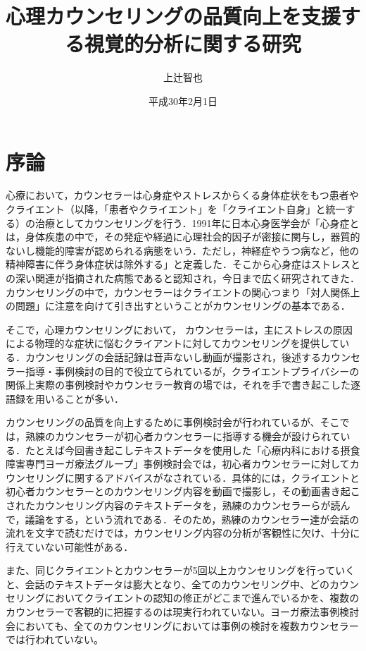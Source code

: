 \documentclass[shuuron]{kuee}
\title{心理カウンセリングの品質向上を支援する視覚的分析に関する研究}
\author{上辻智也}
\date{平成30年2月1日}
\begin{document}
\maketitle
\tableofcontents


\chapter{序論}



心療において，カウンセラーは心身症やストレスからくる身体症状をもつ患者やクライエント（以降，「患者やクライエント」を「クライエント自身」と統一する）の治療としてカウンセリングを行う．1991年に日本心身医学会が「心身症とは，身体疾患の中で，その発症や経過に心理社会的因子が密接に関与し，器質的ないし機能的障害が認められる病態をいう．ただし，神経症やうつ病など，他の精神障害に伴う身体症状は除外する」と定義した\cite{shinshinigaku}．そこから心身症はストレスとの深い関連が指摘された病態であると認知され，今日まで広く研究されてきた．カウンセリングの中で，カウンセラーはクライエントの関心つまり「対人関係上の問題」に注意を向けて引き出すということがカウンセリングの基本である\cite{zokad}．

そこで，心理カウンセリングにおいて， カウンセラーは，主にストレスの原因による物理的な症状に悩むクライアントに対してカウンセリングを提供している．カウンセリングの会話記録は音声ないし動画が撮影され，後述するカウンセラー指導・事例検討の目的で役立てられているが，クライエントプライバシーの関係上実際の事例検討やカウンセラー教育の場では，それを手で書き起こした逐語録を用いることが多い．






カウンセリングの品質を向上するために事例検討会が行われているが、そこでは，熟練のカウンセラーが初心者カウンセラーに指導する機会が設けられている．たとえば今回書き起こしテキストデータを使用した「心療内科における摂食障害専門ヨーガ療法グループ」事例検討会では，初心者カウンセラーに対してカウンセリングに関するアドバイスがなされている．具体的には，クライエントと初心者カウンセラーとのカウンセリング内容を動画で撮影し，その動画書き起こされたカウンセリング内容のテキストデータを，熟練のカウンセラーらが読んで，議論をする，という流れである．そのため，熟練のカウンセラー達が会話の流れを文字で読むだけでは，カウンセリング内容の分析が客観性に欠け、十分に行えていない可能性がある．


また、同じクライエントとカウンセラーが5回以上カウンセリングを行っていくと、会話のテキストデータは膨大となり、全てのカウンセリング中、どのカウンセリングにおいてクライエントの認知の修正がどこまで進んでいるかを、複数のカウンセラーで客観的に把握するのは現実行われていない。ヨーガ療法事例検討会においても、全てのカウンセリングにおいては事例の検討を複数カウンセラーでは行われていない。
\end{document}
